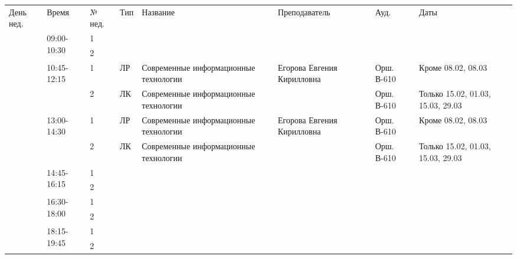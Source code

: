 \begin{tabular}{|p{1cm}|p{2.1cm}|p{0.7cm}|p{1cm}|p{9cm}|p{4cm}|p{2.5cm}|p{2.5cm}|}
\hline
День нед. & Время & № нед. & Тип & Название & Преподаватель & Ауд. & Даты \\
\hhline{|=|=|=|=|=|=|=|=|}
\multirow{12}{*}{Пн} & \multirow{2}{*}{09:00-10:30} & 1 &  &  &  &  & \\
\cline{3-8} & & 2 &  &  &  &  & \\
\cline{2-8} & \multirow{2}{*}{10:45-12:15} & 1 & ЛР  & Современные информационные технологии & Егорова Евгения Кирилловна & Орш. В-610 & Кроме 08.02, 08.03\\
\cline{3-8} & & 2 & ЛК  & Современные информационные технологии &  & Орш. В-610 & Только 15.02, 01.03, 15.03, 29.03\\
\cline{2-8} & \multirow{2}{*}{13:00-14:30} & 1 & ЛР  & Современные информационные технологии & Егорова Евгения Кирилловна & Орш. В-610 & Кроме 08.02, 08.03\\
\cline{3-8} & & 2 & ЛК  & Современные информационные технологии &  & Орш. В-610 & Только 15.02, 01.03, 15.03, 29.03\\
\cline{2-8} & \multirow{2}{*}{14:45-16:15} & 1 &  &  &  &  & \\
\cline{3-8} & & 2 &  &  &  &  & \\
\cline{2-8} & \multirow{2}{*}{16:30-18:00} & 1 &  &  &  &  & \\
\cline{3-8} & & 2 &  &  &  &  & \\
\cline{2-8} & \multirow{2}{*}{18:15-19:45} & 1 &  &  &  &  & \\
\cline{3-8} & & 2 &  &  &  &  & \\
\hline
\end{tabular}
\newpage

